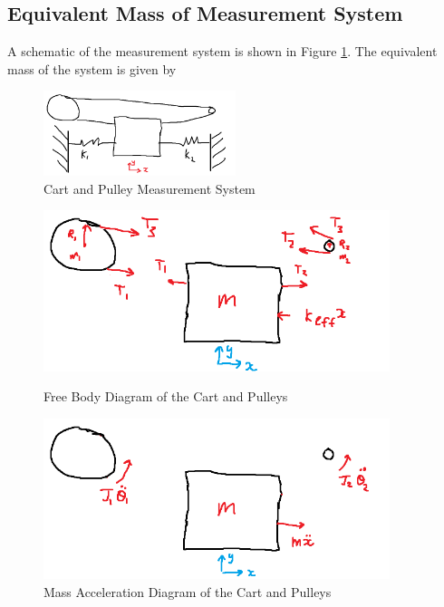 \subsection{Equivalent Mass of Measurement System}
\label{sec:Equivalent Mass}
A schematic of the measurement system is shown in Figure \ref{fig:Measurement System}. The equivalent mass of the system is given by
\begin{figure}[H]
    \centering
    \includegraphics[width=0.5\textwidth]{Sections/Figures/system.png}
    \caption{Cart and Pulley Measurement System}
    \label{fig:Measurement System}
\end{figure}
\begin{figure}[h]
    \centering 
    \begin{minipage}{0.45\textwidth}
        \centering
        \includegraphics[width=0.9\textwidth]{Sections/Figures/fbd.png}
        \caption{Free Body Diagram of the Cart and Pulleys}
        \label{fig:Cart FBD}
    \end{minipage}\qquad
    \begin{minipage}{0.45\textwidth}
        \centering
        \includegraphics[width=0.9\textwidth]{Sections/Figures/mad.png}
        \caption{Mass Acceleration Diagram of the Cart and Pulleys}
        \label{fig:Cart MAD}
    \end{minipage}  
\end{figure}
